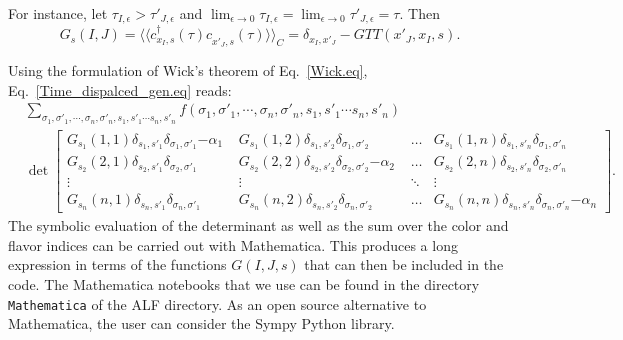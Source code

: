 For instance, let  $\tau_{I,\epsilon}   > \tau'_{J,\epsilon}  $  and $ \lim_{\epsilon \rightarrow 0 } \tau_{I,\epsilon}   = \lim_{\epsilon \rightarrow 0 }\tau'_{J,\epsilon} = \tau$. Then 
\begin{equation}
	G_s(I,J)   =  \langle \langle  c^{\dagger}_{x_I,s}(\tau) c^{\phantom\dagger}_{x'_{J},s}(\tau)  \rangle \rangle_{C}  =   \delta_{x_I,x'_J} -  GTT(x'_J,x_I,s).
\end{equation}

Using the formulation of Wick's theorem of Eq.~\eqref{Wick.eq},  Eq.~\eqref{Time_dispalced_gen.eq}  reads: 
\begin{align}
	& \sum_{\sigma_1, \sigma'_1, \cdots, \sigma_n, \sigma'_n,  s_1, s'_1  \cdots s_n,  s'_n  }  f( \sigma_1, \sigma'_1, \cdots, \sigma_n, \sigma'_n,  s_1, s'_1  \cdots s_n,  s'_n ) 
	\\
	& \det  
\begin{bmatrix}
   G_{s_1}(1,1) \delta_{s_1,s'_1} \delta_{\sigma_1,\sigma'_1}  {- \alpha_1} & 
   G_{s_1}(1,2) \delta_{s_1,s'_2} \delta_{\sigma_1,\sigma'_2}   \phantom{ - \alpha_1}         &\! \dots  \!    &   
   G_{s_1}(1,n) \delta_{s_1,s'_n} \delta_{\sigma_1,\sigma'_n}   \phantom{ - \alpha_1} \\
   G_{s_2}(2,1) \delta_{s_2,s'_1} \delta_{\sigma_2,\sigma'_1}  \phantom{ - \alpha_1} &   
   G_{s_2}(2,2) \delta_{s_2,s'_2} \delta_{\sigma_2,\sigma'_2}  {- \alpha_2}  & \! \dots  \! &
    G_{s_2}(2,n) \delta_{s_2,s'_n} \delta_{\sigma_2,\sigma'_n} \phantom{ - \alpha_2}  \\
    \vdots & \vdots & \!   \ddots  \!  & \vdots \\
    G_{s_n}(n,1) \delta_{s_n,s'_1} \delta_{\sigma_n,\sigma'_1}   \phantom{- \alpha_n} & 
    G_{s_n}(n,2) \delta_{s_n,s'_2} \delta_{\sigma_n,\sigma'_2}   \phantom{- \alpha_n} & \! \dots   \!  & 
    G_{s_n}(n,n) \delta_{s_n,s'_n} \delta_{\sigma_n,\sigma'_n}   {- \alpha_n } 
 \end{bmatrix}.   \nonumber 
\end{align}
The  symbolic evaluation of the  determinant   as well as the sum over the color and flavor indices can be carried out with Mathematica.  This  produces a  long expression in terms of the   functions $G(I,J,s)$ that can then be  included in the code.   The Mathematica notebooks  that we use  can be found in the directory  \texttt{Mathematica}  of  the ALF  directory.   As an open source alternative to Mathematica, the user can consider the Sympy Python library. 
